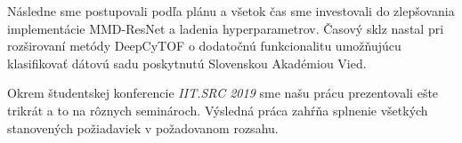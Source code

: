 Následne sme postupovali podľa plánu a všetok čas sme investovali do zlepšovania implementácie MMD-ResNet a ladenia hyperparametrov. Časový sklz nastal pri rozširovaní metódy DeepCyTOF o dodatočnú funkcionalitu umožňujúcu klasifikovať dátovú sadu poskytnutú Slovenskou Akadémiou Vied.

Okrem študentskej konferencie \textit{IIT.SRC 2019} sme našu prácu prezentovali ešte trikrát a to na rôznych seminároch. Výsledná práca zahŕňa splnenie všetkých stanovených požiadaviek v požadovanom rozsahu.




